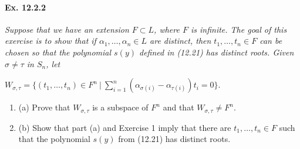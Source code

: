 \documentclass[11pt,a4paper]{article}
\newcommand{\be} {\begin{enumerate}}
\newcommand{\ee} {\end{enumerate}}
\begin{document}
\paragraph{Ex. 12.2.2}

{\it Suppose that we have an extension $F \subset L$, where $F$ is infinite. The goal of this exercise is to show that if $\alpha_1,\ldots,\alpha_n \in L$ are distinct, then $t_1,\ldots,t_n \in F$ can be chosen so that the polynomial $s(y)$ defined in (12.21) has distinct roots. Given $\sigma \ne \tau$ in $S_n$, let
\begin{center}
$W_{\sigma,\tau} =  \{(t_1,\ldots,t_n) \in F^n \ {\big | }\ \sum_{i=1}^n (\alpha_{\sigma(i)} - \alpha_{\tau(i)}) t_i = 0 \}.$
\be
\item[(a)] Prove that $W_{\sigma,\tau}$ is a subspace of $F^n$ and that $W_{\sigma,\tau} \ne F^n$.
\item[(b)] Show that part (a) and Exercise 1 imply that there are $t_1,\ldots,t_n \in F$ such that the polynomial $s(y)$ from (12.21) has distinct roots.
\ee

\end{center}
}
\end{document}
